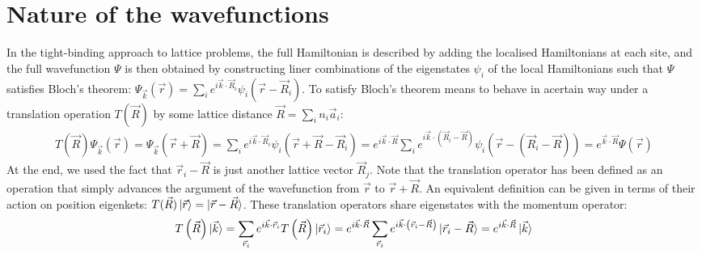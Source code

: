 \documentclass{report}
\numberwithin{equation}{section}
\begin{document}
\section{Nature of the wavefunctions}
In the tight-binding approach to lattice problems, the full Hamiltonian is described by adding the localised Hamiltonians at each site, and the full wavefunction \(\Psi\) is then obtained by constructing liner combinations of the eigenstates \(\psi_i\) of the local Hamiltonians such that \(\Psi\) satisfies Bloch's theorem: \(\Psi_{\vec k}(\vec r) = \sum_i e^{i \vec{k}\cdot\vec{R}_i} \psi_i(\vec r - \vec R_i)\). To satisfy Bloch's theorem means to behave in acertain way under a translation operation \(T(\vec R)\) by some lattice distance \(\vec R = \sum_i n_i \vec a_i\):
\begin{equation}\begin{aligned}
T(\vec R)\Psi_{\vec k}\left(\vec r\right) = \Psi_{\vec k}(\vec r + \vec R) = \sum_i e^{i \vec{k}\cdot\vec{R}_i} \psi_i(\vec r + \vec R - \vec R_i) = e^{i \vec{k}\cdot\vec{R}}\sum_i e^{i \vec{k}\cdot\left(\vec{R}_i - \vec R\right)} \psi_i(\vec r - (\vec R_i - \vec R)) = e^{\vec{k}\cdot\vec{R}}\Psi(\vec r)
\end{aligned}\end{equation}
At the end, we used the fact that \(\vec r_i - \vec R\) is just another lattice vector \(\vec R_j\). Note that the translation operator has been defined as an operation that simply advances the argument of the wavefunction from \(\vec r\) to \(\vec r + \vec R\). An equivalent definition can be given in terms of their action on position eigenkets: \(T(\vec R)\ket{\vec r} = \ket{\vec r - \vec R}\). These translation operators share eigenstates with the momentum operator:
\begin{equation}\begin{aligned}
	T\left( \vec R \right) \ket{\vec k} = \sum_{\vec r_i} e^{i \vec{k}\cdot\vec{r}_i}T\left( \vec R \right)\ket{\vec r_i} = e^{i \vec{k}\cdot\vec{R}}\sum_{\vec r_i} e^{i \vec{k}\cdot\left(\vec{r}_i - \vec R\right)}\ket{\vec r_i - \vec R} = e^{i \vec{k}\cdot\vec{R}} \ket{\vec k}
\end{aligned}\end{equation}
\end{document}
